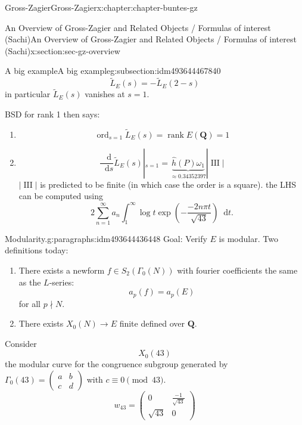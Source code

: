 \documentclass[oneside,10pt,]{book}
\numberwithin{equation}{section}
\newcommand{\diff}{\mathop{}\!\mathrm{d}}
\DeclareMathOperator{\Sha}{III}
\newcommand{\QQ}{\mathbf{Q}}
\DeclareMathOperator{\rank}{rank}
\DeclareMathOperator{\ord}{ord}
\newcommand{\amp}{&}
\begin{document}
\begin{chapterptx}{Gross-Zagier}{}{Gross-Zagier}{}{}{x:chapter:chapter-buntes-gz}
\begin{sectionptx}{An Overview of Gross-Zagier and Related Objects \slash{} Formulas of interest (Sachi)}{}{An Overview of Gross-Zagier and Related Objects \slash{} Formulas of interest (Sachi)}{}{}{x:section:sec-gz-overview}
\begin{subsectionptx}{A big example}{}{A big example}{}{}{g:subsection:idm493644467840}
\begin{equation*}
\widetilde L_E(s) = - \widetilde L_E(2-s)
\end{equation*}
in particular \(\widetilde L_E(s)\) vanishes at \(s=1\).%
\par
BSD for rank 1 then says:%
\begin{enumerate}
\item{}%
\begin{equation*}
\ord_{s=1} \widetilde L_E(s) = \rank E(\QQ) = 1
\end{equation*}
%
\item{}%
\begin{equation*}
\frac{\diff}{\diff s} \widetilde L_E(s)|_{s=1} = \underbrace{\hat h ( P) \omega _1}_{\approx 0.34352397} |\Sha|
\end{equation*}
\(|\Sha|\) is predicted to be finite (in which case the order is a square). the LHS can be computed using%
\begin{equation*}
2\sum_{n=1}^\infty  a_n \int_1^\infty  \log t \exp\left(- \frac{-2 n  \pi  t  }{\sqrt{43}}\right) \diff t\text{.}
\end{equation*}
%
\end{enumerate}
%
\begin{paragraphs}{Modularity.}{g:paragraphs:idm493644436448}%
Goal: Verify \(E\) is modular. Two definitions today:%
\begin{enumerate}
\item{}There exists a newform \(f \in S_2(\Gamma _0(N))\) with fourier coefficients the same as the \(L\)-series:%
\begin{equation*}
a_p(f) = a_p(E)
\end{equation*}
for all \(p\nmid N\).%
\item{}There exists \(X_0(N) \to E\) finite defined over \(\QQ\).%
\end{enumerate}
%
\par
Consider%
\begin{equation*}
X_0(43)
\end{equation*}
the modular curve for the congruence subgroup generated by \(\Gamma _0(43) = \begin{pmatrix} a \amp b \\ c \amp d \end{pmatrix}\) with \(c \equiv  0 \pmod{43}\).%
\begin{equation*}
w_{43} =  \begin{pmatrix} 0 \amp \frac{-1}{\sqrt{43}} \\ \sqrt{43} \amp 0\end{pmatrix}

\end{equation*}
\end{paragraphs}
\end{subsectionptx}
\end{sectionptx}
\end{chapterptx}
\end{document}
